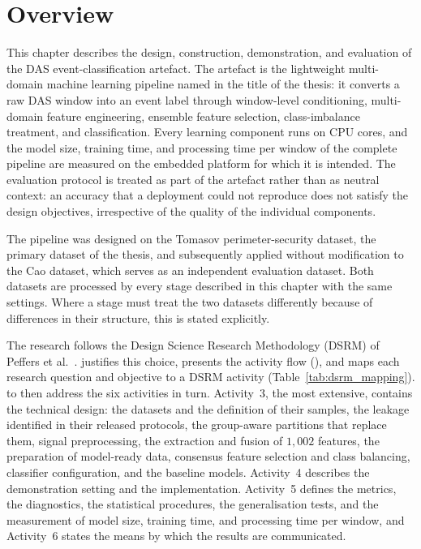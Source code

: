 \section{Overview}%
\label{sec:chap3Overview}
This chapter describes the design, construction, demonstration, and evaluation of the DAS event-classification artefact. The artefact is the lightweight multi-domain machine learning pipeline named in the title of the thesis: it converts a raw DAS window into an event label through window-level conditioning, multi-domain feature engineering, ensemble feature selection, class-imbalance treatment, and classification. Every learning component runs on CPU cores, and the model size, training time, and processing time per window of the complete pipeline are measured on the embedded platform for which it is intended. The evaluation protocol is treated as part of the artefact rather than as neutral context: an accuracy that a deployment could not reproduce does not satisfy the design objectives, irrespective of the quality of the individual components.

The pipeline was designed on the Tomasov perimeter-security dataset, the primary dataset of the thesis, and subsequently applied without modification to the Cao dataset, which serves as an independent evaluation dataset. Both datasets are processed by every stage described in this chapter with the same settings. Where a stage must treat the two datasets differently because of differences in their structure, this is stated explicitly.

The research follows the Design Science Research Methodology (DSRM) of Peffers et al.~\cite{peffers2007dsrm}.  justifies this choice, presents the activity flow (), and maps each research question and objective to a DSRM activity (Table~\ref{tab:dsrm_mapping}).  to  then address the six activities in turn. Activity~3, the most extensive, contains the technical design: the datasets and the definition of their samples, the leakage identified in their released protocols, the group-aware partitions that replace them, signal preprocessing, the extraction and fusion of $1{,}002$ features, the preparation of model-ready data, consensus feature selection and class balancing, classifier configuration, and the baseline models. Activity~4 describes the demonstration setting and the implementation. Activity~5 defines the metrics, the diagnostics, the statistical procedures, the generalisation tests, and the measurement of model size, training time, and processing time per window, and Activity~6 states the means by which the results are communicated.

